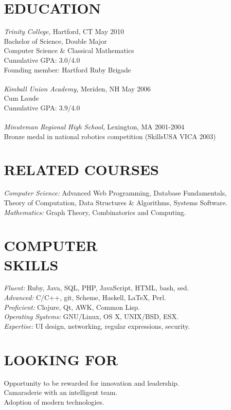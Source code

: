 \documentclass[line,margin]{res}
\begin{document}
\begin{resume}
\section{EDUCATION}
	{\sl Trinity College,}
	Hartford, CT \hfill May 2010 \\
	Bachelor of Science, Double Major \\
	Computer Science \& Classical Mathematics \\
	Cumulative GPA: 3.0/4.0 \\
	Founding member: Hartford Ruby Brigade \\
	\\
	{\sl Kimball Union Academy,}
	Meriden, NH \hfill May 2006 \\
	Cum Laude \\
	Cumulative GPA: 3.9/4.0 \\
	\\
	{\sl Minuteman Regional High School,}
	Lexington, MA \hfill 2001-2004 \\
	Bronze medal in national robotics competition (SkillsUSA VICA 2003)
	
\section{RELATED COURSES}
	{\sl Computer Science:}
	Advanced Web Programming,
	Database Fundamentals,
	Theory of Computation,
	Data Structures \& Algorithms,
	Systems Software.
	\\
	{\sl Mathematics:}
	Graph Theory,
	Combinatorics and Computing.
                
\section{COMPUTER \\ SKILLS}
	{\sl Fluent:} 
	Ruby, 
	Java, 
	SQL, 
	PHP, 
	JavaScript, 
	HTML, 
	bash,
	sed.
	\\
	{\sl Advanced:}
	C/C++, 
	git,
	Scheme,
	Haskell,
	\LaTeX,
	Perl.
	\\
	{\sl Proficient:} 
	Clojure,
	Qt,
	AWK,
	Common Lisp.
	\\
	{\sl Operating Systems:}
	GNU/Linux, OS X, UNIX/BSD, ESX.
	\\
	{\sl Expertise:}
	UI design,
	networking,
	regular expressions,
	security.

\section{LOOKING FOR}
	Opportunity to be rewarded for innovation and leadership. \\
	Camaraderie with an intelligent team. \\
	Adoption of modern technologies.
	
	
\end{resume}
\end{document}
